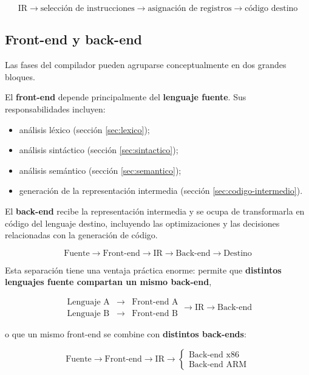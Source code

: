 \documentclass[11pt,a4paper]{article}
\begin{document}
\[
\text{IR} \rightarrow \text{selección de instrucciones} \rightarrow \text{asignación de
registros} \rightarrow \text{código destino}
\]

\subsection{Front-end y back-end}
\label{sec:frontend-backend}

Las fases del compilador pueden agruparse conceptualmente en dos grandes bloques.

El \textbf{front-end} depende principalmente del \textbf{lenguaje fuente}. Sus responsabilidades
incluyen:

\begin{itemize}
    \item análisis léxico (sección \ref{sec:lexico});
    \item análisis sintáctico (sección \ref{sec:sintactico});
    \item análisis semántico (sección \ref{sec:semantico});
    \item generación de la representación intermedia (sección \ref{sec:codigo-intermedio}).
\end{itemize}

El \textbf{back-end} recibe la representación intermedia y se ocupa de transformarla en código
del lenguaje destino, incluyendo las optimizaciones y las decisiones relacionadas con la
generación de código.

\[
\text{Fuente} \rightarrow \boxed{\text{Front-end}} \rightarrow \text{IR} \rightarrow
\boxed{\text{Back-end}} \rightarrow \text{Destino}
\]

Esta separación tiene una ventaja práctica enorme: permite que \textbf{distintos lenguajes
fuente compartan un mismo back-end},

\[
\begin{array}{ccc}
\text{Lenguaje A} & \rightarrow & \text{Front-end A} \\
\text{Lenguaje B} & \rightarrow & \text{Front-end B}
\end{array}
\rightarrow
\text{IR}
\rightarrow
\text{Back-end}
\]

o que un mismo front-end se combine con \textbf{distintos back-ends}:

\[
\text{Fuente}
\rightarrow
\text{Front-end}
\rightarrow
\text{IR}
\rightarrow
\begin{cases}
\text{Back-end x86} \\
\text{Back-end ARM}
\end{cases}
\]
\end{document}

